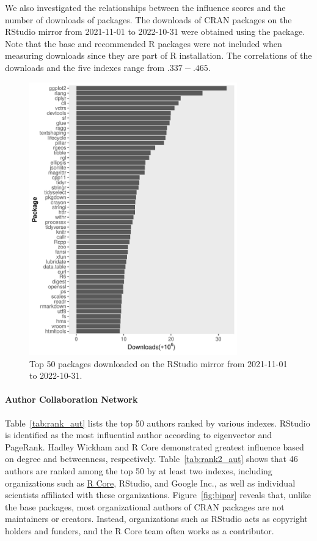 We also investigated the relationships between the influence scores and the number of downloads of packages. The downloads of CRAN packages on the RStudio mirror from 2021-11-01 to 2022-10-31 were obtained using the  \citep{cranlogs} package. Note that the base and recommended R packages were not included when measuring downloads since they are part of R installation.  The correlations of the downloads and the five indexes range from $.337-.465$. 


\begin{figure}[h]
\centering
    \includegraphics[width=9cm]{fig/downloads_50_plot.pdf}
    \caption{Top 50 packages downloaded on the RStudio mirror from 2021-11-01 to 2022-10-31.}

    \label{fig:download}
\end{figure}




\paragraph{Author Collaboration Network} Table~\ref{tab:rank_aut} lists the top 50 authors ranked by various indexes. RStudio is identified as the most influential author according to eigenvector and PageRank. Hadley Wickham and R Core demonstrated greatest influence based on degree and betweenness, respectively. Table~\ref{tab:rank2_aut} shows that 46 authors are ranked among the top 50 by at least two indexes, including organizations such as \href{https://www.r-project.org/contributors.html}{R Core}, RStudio, and Google Inc., as well as individual scientists affiliated with these organizations. Figure~\ref{fig:bipar} reveals that, unlike the base packages, most organizational authors of CRAN packages are not maintainers or creators. Instead, organizations such as RStudio acts as copyright holders and funders, and the R Core team often works as a contributor.

